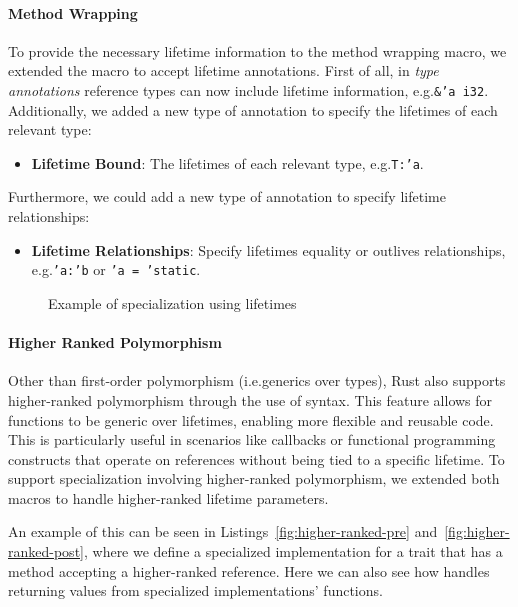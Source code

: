 \paragraph{Method Wrapping}
To provide the necessary lifetime information to the method wrapping macro, we extended the  macro to accept lifetime annotations.
First of all, in \textit{type annotations} reference types can now include lifetime information, e.g.\@ \mbox{\texttt{\&'a i32}}.
Additionally, we added a new type of annotation to specify the lifetimes of each relevant type:
\begin{itemize}
	\item \textbf{Lifetime Bound}: The lifetimes of each relevant type, e.g.\@ \mbox{\texttt{T:\@ 'a}}.
\end{itemize}
Furthermore, we could add a new type of annotation to specify lifetime relationships:
\begin{itemize}
	\item \textbf{Lifetime Relationships}: Specify lifetimes equality or outlives relationships, e.g.\@ \mbox{\texttt{'a:\@ 'b}} or \mbox{\texttt{'a = 'static}}.
\end{itemize}

\begin{figure}[htbp!]
	\centering
	\captionsetup{type=listing,skip=2pt}
	\caption{Example of specialization using lifetimes}
	\label{fig:lifetimes-specialization-pre}
\end{figure}

\paragraph{Higher Ranked Polymorphism}
Other than first-order polymorphism (i.e.\@ generics over types), Rust also supports higher-ranked polymorphism through the use of  syntax.
This feature allows for functions to be generic over lifetimes, enabling more flexible and reusable code.
This is particularly useful in scenarios like callbacks or functional programming constructs that operate on references without being tied to a specific lifetime.
To support specialization involving higher-ranked polymorphism, we extended both macros to handle higher-ranked lifetime parameters.

An example of this can be seen in Listings~\ref{fig:higher-ranked-pre} and~\ref{fig:higher-ranked-post}, where we define a specialized implementation for a trait  that has a method  accepting a higher-ranked reference.
Here we can also see how \mytool{} handles returning values from specialized implementations' functions.

